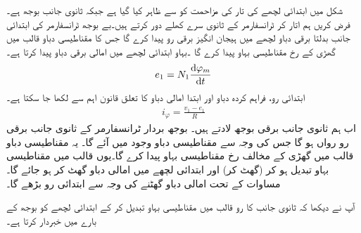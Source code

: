 شکل  میں ابتدائی لچھے کی تار کی مزاحمت کو  سے ظاہر کیا گیا ہے جبکہ ثانوی جانب بوجھ  ہے۔ فرض کریں ہم   اتار کر  ٹرانسفارمر کے ثانوی سرے کھلے دور کرتے ہیں۔بے بوجھ ٹرانسفارمر کی ابتدائی جانب بدلتا برقی دباو   لچھے میں ہیجان انگیز برقی رو  پیدا کرے گا  جس کا  مقناطیسی دباو  قالب میں گھڑی کے رخ  مقناطیسی بہاو  پیدا کرے گا ۔بہاو   ابتدائی لچھے میں  امالی برقی دباو پیدا کرتا ہے۔
\begin{align}\label{مساوات_ٹرانسفارمر_دباو_برابر_بہاو_تفرق}
e_1=N_1 \frac{\dif \varphi_m}{\dif t}
\end{align}
ابتدائی رو، فراہم کردہ دباو اور ابتدا امالی دباو کا تعلق قانون اہم سے لکھا جا سکتا ہے۔
\begin{align}\label{مساوات_ٹرانسفارمر_امالی_دباو_اور_رو}
i_{\varphi}=\frac{v_1-e_1}{R}
\end{align} 
اب ہم ثانوی جانب  برقی بوجھ  لادتے ہیں۔  بوجھ بردار ٹرانسفارمر  کے  ثانوی جانب  برقی رو  رواں ہو گا جس کی وجہ سے  مقناطیسی دباو وجود میں آئے گا۔ یہ مقناطیسی دباو  قالب میں گھڑی کے مخالف رخ مقناطیسی بہاو   پیدا کرے گا۔یوں قالب میں  مقناطیسی بہاو تبدیل  ہو کر  (گھٹ کر)
  اور ابتدائی لچھے میں امالی دباو گھٹ کر  ہو جائے گا۔ مساوات  کے تحت امالی دباو گھٹنے کی وجہ سے ابتدائی رو  بڑھے گا۔ 

آپ نے دیکھا کہ ثانوی جانب کا رو قالب میں مقناطیسی بہاو  تبدیل کر کے ابتدائی لچھے کو بوجھ کے بارے میں خبردار کرتا ہے۔


